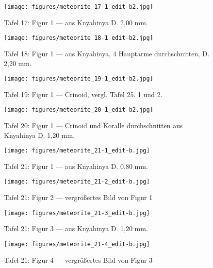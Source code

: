 \documentclass[a4paper, 12pt, oneside]{article}
\begin{document}
\clearpage
{}
\begin{figure}[t]
\texttt{[image: figures/meteorite\_17-1\_edit-b2.jpg]}
\caption{Tafel 17: Figur 1 --- aus Knyahinya D. 2,00 mm.}
\centering
\end{figure}
\clearpage
{}
\begin{figure}[t]
\texttt{[image: figures/meteorite\_18-1\_edit-b2.jpg]}
\caption{Tafel 18: Figur 1 --- aus Knyahinya, 4 Hauptarme durchschnitten, D. 2,20 mm.}
\centering
\end{figure}
\clearpage
{}
\begin{figure}[t]
\texttt{[image: figures/meteorite\_19-1\_edit-b2.jpg]}
\caption{Tafel 19: Figur 1 --- Crinoid, vergl. Tafel 25. 1 und 2.}
\centering
\end{figure}
\clearpage
{}
\begin{figure}[t]
\texttt{[image: figures/meteorite\_20-1\_edit-b2.jpg]}
\caption{Tafel 20: Figur 1 --- Crinoid und Koralle durchschnitten aus Knyahinya D. 1,20 mm.}
\centering
\end{figure}
\clearpage
{}
\begin{figure}[t]
\texttt{[image: figures/meteorite\_21-1\_edit-b.jpg]}
\caption{Tafel 21: Figur 1 --- aus Knyahinya D. 0,80 mm.}
\centering
\end{figure}
\clearpage
\begin{figure}[t]
\texttt{[image: figures/meteorite\_21-2\_edit-b.jpg]}
\caption{Tafel 21: Figur 2 --- vergrößertes Bild von Figur 1}
\centering
\end{figure}
\clearpage
\begin{figure}[t]
\texttt{[image: figures/meteorite\_21-3\_edit-b.jpg]}
\caption{Tafel 21: Figur 3 --- aus Knyahinya D. 1,20 mm.}
\centering
\end{figure}
\clearpage
\begin{figure}[t]
\texttt{[image: figures/meteorite\_21-4\_edit-b.jpg]}
\caption{Tafel 21: Figur 4 --- vergrößertes Bild von Figur 3}
\centering
\end{figure}
\clearpage
\end{document}
